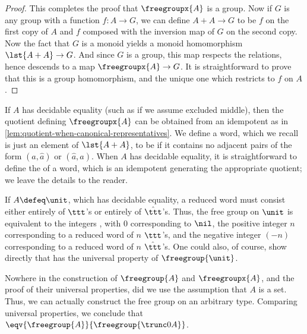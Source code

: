 \begin{proof}
  This completes the proof that $\freegroupx{A}$ is a group.
  Now if $G$ is any group with a function $f:A\to G$, we can define $A+A\to G$ to be $f$ on the first copy of $A$ and $f$ composed with the inversion map of $G$ on the second copy.
  Now the fact that $G$ is a monoid yields a monoid homomorphism $\lst{A+A} \to G$.
  And since $G$ is a group, this map respects the relations, hence descends to a map $\freegroupx{A}\to G$.
  It is straightforward to prove that this is a group homomorphism, and the unique one which restricts to $f$ on $A$.
\end{proof}

%

If $A$ has decidable equality (such as if we assume excluded middle), then the quotient defining $\freegroupx{A}$ can be obtained from an idempotent as in \cref{lem:quotient-when-canonical-representatives}.
We define a word, which we recall is just an element of $\lst{A+A}$, to be 
if it contains no adjacent pairs of the form $(a,\hat a)$ or $(\hat a,a)$.
When $A$ has decidable equality, it is straightforward to define the 
%
of a word, which is an idempotent generating the appropriate quotient; we leave the details to the reader.

If $A\defeq \unit$, which has decidable equality, a reduced word must consist either entirely of $\ttt$'s or entirely of $\hat{\ttt}$'s.
Thus, the free group on $\unit$ is equivalent to the integers \Z, with $0$ corresponding to $\nil$, the positive integer $n$ corresponding to a reduced word of $n$ $\ttt$'s, and the negative integer $(-n)$ corresponding to a reduced word of $n$ $\hat{\ttt}$'s.
One could also, of course, show directly that \Z has the universal property of $\freegroup{\unit}$.

\begin{rmk}\label{thm:freegroup-nonset}
  Nowhere in the construction of $\freegroup{A}$ and $\freegroupx{A}$, and the proof of their universal properties, did we use the assumption that $A$ is a set.
  Thus, we can actually construct the free group on an arbitrary type.
  Comparing universal properties, we conclude that $\eqv{\freegroup{A}}{\freegroup{\trunc0A}}$.
\end{rmk}

%

